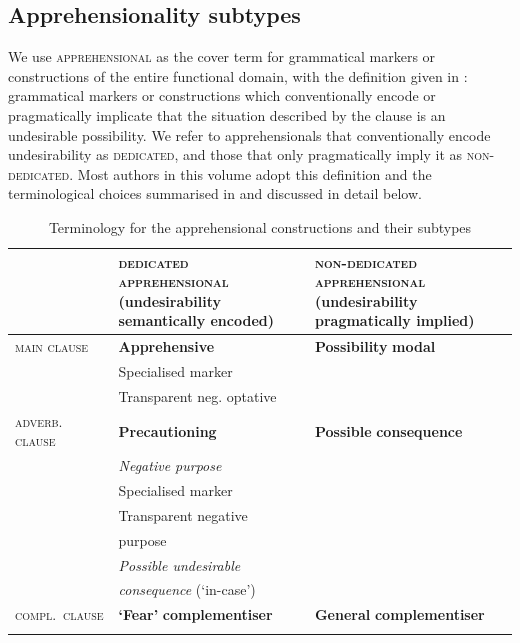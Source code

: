\documentclass[output=paper,colorlinks,citecolor=brown
]{langscibook}
\begin{document}
\subsection{Apprehensionality subtypes}
\label{subsec:apprsubtypes}

We use \textsc{apprehensional} as the cover term for grammatical markers or constructions of the entire functional domain, with the definition given in : grammatical markers or constructions which conventionally encode or pragmatically implicate that the situation described by the clause is an undesirable possibility. We refer to apprehensionals that conventionally encode undesirability as \textsc{dedicated}, and those that only pragmatically imply it as \textsc{non-dedicated}. Most authors in this volume adopt this definition and the terminological choices summarised in  and discussed in detail below.

\begin{table}
\caption{Terminology for the apprehensional constructions and their subtypes}
\label{tab1_alternative}
\begin{tabular}{L{1.4cm}L{4.6cm}L{4.6cm}}
\lsptoprule

& {\bfseries \textsc{dedicated} \textsc{apprehensional}}
 \textrm{(undesirability semantically encoded)} 
 & {\bfseries \textsc{non-dedicated} \textsc{apprehensional}}
 \textrm{(undesirability pragmatically implied)}\\\midrule

\textsc{main clause} & {\bfseries Apprehensive} & \textrm{\textbf{Possibility} \textbf{modal}} \\
& \hspace{8pt} \textrm{Specialised marker} & \\
& \hspace{8pt} \textrm{Transparent neg. optative} & \\
\textsc{adverb. clause} & \textrm{\textbf{Precautioning}} & \textrm{\textbf{Possible} \textbf{consequence}}\\
& \hspace{8pt} \textrm{\textit{Negative purpose}} & \\
& \hspace{16pt} \textrm{Specialised marker}    &   \\    
& \hspace{16pt} \textrm{Transparent negative} &  \\
& \hspace{16pt} \textrm{purpose} & \\
& \hspace{8pt} \textit{Possible undesirable} \\
& \hspace{8pt} \textit{consequence} \textrm{(`in-case')} & \\

\textsc{compl.\ clause} & \textrm{\textbf{`Fear'} \textbf{complementiser}} & \textrm{\textbf{General} \textbf{complementiser}} \\
\lspbottomrule
\end{tabular}
\end{table}
\end{document}
